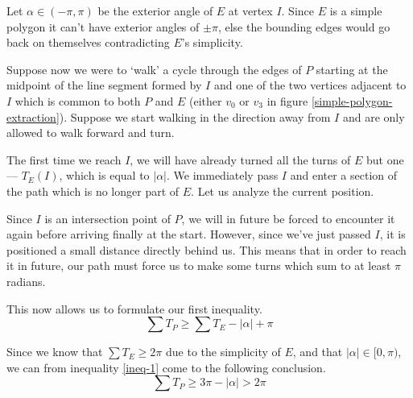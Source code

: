 \documentclass{article}
\begin{document}
Let \(\alpha \in (-\pi, \pi)\) be the exterior angle of \(E\) at vertex \(I\). Since \(E\) is a simple polygon it can't have exterior angles of \(\pm\pi\), else the bounding edges would go back on themselves contradicting \(E\)'s simplicity.

Suppose now we were to `walk' a cycle through the edges of \(P\) starting at the midpoint of the line segment formed by \(I\) and one of the two vertices adjacent to \(I\) which is common to both \(P\) and \(E\) (either \(v_0\) or \(v_3\) in figure \ref{simple-polygon-extraction}). Suppose we start walking in the direction away from \(I\) and are only allowed to walk forward and turn.

The first time we reach \(I\), we will have already turned all the turns of \(E\) but one --- \(T_E(I)\), which is equal to \(|\alpha|\). We immediately pass \(I\) and enter a section of the path which is no longer part of \(E\). Let us analyze the current position.

Since \(I\) is an intersection point of \(P\), we will in future be forced to encounter it again before arriving finally at the start. However, since we've just passed \(I\), it is positioned a small distance directly behind us. This means that in order to reach it in future, our path must force us to make some turns which sum to at least \(\pi\) radians.

This now allows us to formulate our first inequality.
\begin{equation}
	\sum T_P \geq \sum T_E - |\alpha| + \pi \label{ineq-1}
\end{equation}

Since we know that \(\sum T_E \geq 2\pi\) due to the simplicity of \(E\), and that \(|\alpha| \in [0, \pi)\), we can from inequality \ref{ineq-1} come to the following conclusion.
\begin{equation}
	\sum T_P \geq 3\pi - |\alpha| > 2\pi
\end{equation}
\end{document}
